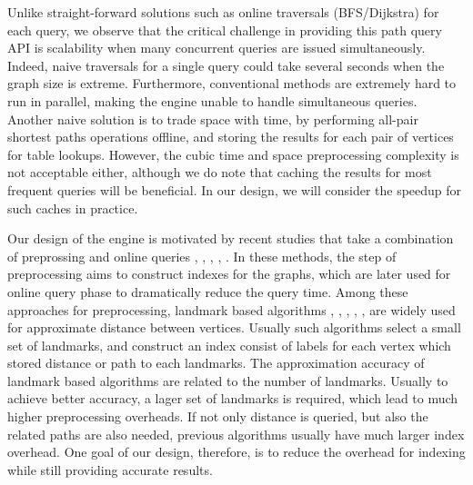 Unlike straight-forward solutions such as online traversals (BFS/Dijkstra) for each query, we observe that the critical challenge in providing this path query API is scalability when many concurrent queries are issued simultaneously. Indeed, naive traversals for a single query could take several seconds when the graph size is extreme. Furthermore, conventional methods are extremely hard to run in parallel, making the engine unable to handle simultaneous queries. Another naive solution is to trade space with time, by performing all-pair shortest paths operations offline, and storing the results for each pair of vertices for table lookups. However, the cubic time and space preprocessing complexity is not acceptable either, although we do note that caching the results for most frequent queries will be beneficial. In our design, we will consider the speedup for such caches in practice.
 
Our design of the engine is motivated by recent studies that take a combination of preprossing and online queries \cite{Potamias:2009:FSP:1645953.1646063}, \cite{tretyakov2011fast}, \cite{Akiba:2012:SQC:2247596.2247614}, \cite{6399472}, \cite{Jin:2012:HLA:2213836.2213887}. In these methods, the step of preprocessing aims to construct indexes for the graphs, which are later used for online query phase to dramatically reduce the query time. Among these approaches for preprocessing, landmark based algorithms \cite{Thorup:2005:ADO:1044731.1044732}, \cite{Goldberg:2005:CSP:1070432.1070455}, \cite{Potamias:2009:FSP:1645953.1646063}, \cite{Gubichev:2010:FAE:1871437.1871503}, \cite{tretyakov2011fast}, \cite{6399472} are widely used for approximate distance between vertices. Usually such algorithms select a small set of landmarks, and construct an index consist of labels for each vertex which stored distance or path to each landmarks. The approximation accuracy of landmark based algorithms are related to the number of landmarks. Usually to achieve better accuracy, a lager set of landmarks is required, which lead to much higher preprocessing overheads. If not only distance is queried, but also the related paths are also needed, previous algorithms usually have much larger index overhead. One goal of our design, therefore, is to reduce the overhead for indexing while still providing accurate results.


